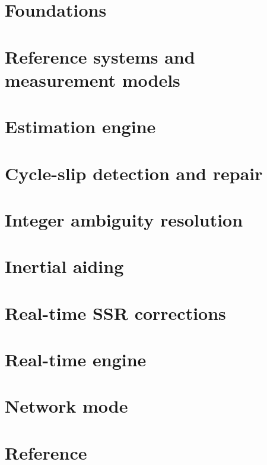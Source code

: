 \documentclass[11pt,letterpaper]{article}
\begin{document}
\part{Foundations}


\part{Reference systems and measurement models}







\part{Estimation engine}




\part{Cycle-slip detection and repair}


\part{Integer ambiguity resolution}


\part{Inertial aiding}


\part{Real-time SSR corrections}


\part{Real-time engine}


\part{Network mode}






\part{Reference}


\appendix



\printbibliography
\end{document}
